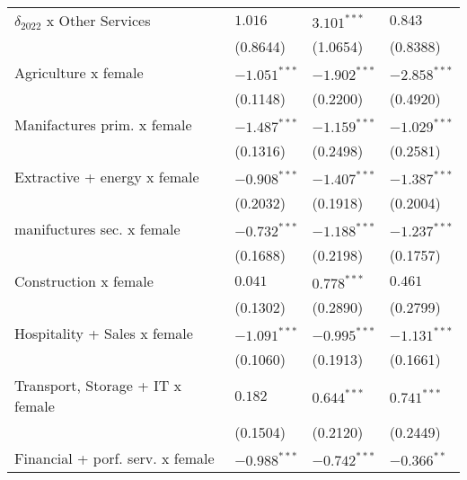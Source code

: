 \begin{tabular}{llll}
$\delta_{2022}$ x Other Services                   &            $1.016$ &      $3.101^{***}$ &            $0.843$ \\
                                                   &           (0.8644) &           (1.0654) &           (0.8388) \\
Agriculture x female                               &     $-1.051^{***}$ &     $-1.902^{***}$ &     $-2.858^{***}$ \\
                                                   &           (0.1148) &           (0.2200) &           (0.4920) \\
Manifactures prim. x female                        &     $-1.487^{***}$ &     $-1.159^{***}$ &     $-1.029^{***}$ \\
                                                   &           (0.1316) &           (0.2498) &           (0.2581) \\
Extractive + energy x female                       &     $-0.908^{***}$ &     $-1.407^{***}$ &     $-1.387^{***}$ \\
                                                   &           (0.2032) &           (0.1918) &           (0.2004) \\
manifuctures sec. x female                         &     $-0.732^{***}$ &     $-1.188^{***}$ &     $-1.237^{***}$ \\
                                                   &           (0.1688) &           (0.2198) &           (0.1757) \\
Construction x female                              &            $0.041$ &      $0.778^{***}$ &            $0.461$ \\
                                                   &           (0.1302) &           (0.2890) &           (0.2799) \\
Hospitality + Sales x female                       &     $-1.091^{***}$ &     $-0.995^{***}$ &     $-1.131^{***}$ \\
                                                   &           (0.1060) &           (0.1913) &           (0.1661) \\
Transport, Storage + IT x female                   &            $0.182$ &      $0.644^{***}$ &      $0.741^{***}$ \\
                                                   &           (0.1504) &           (0.2120) &           (0.2449) \\
Financial + porf. serv. x female                   &     $-0.988^{***}$ &     $-0.742^{***}$ &      $-0.366^{**}$ \\

\end{tabular}
